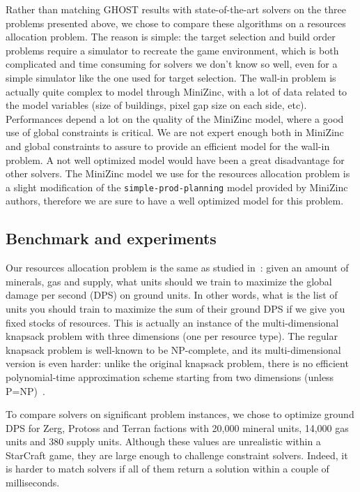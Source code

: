 \documentclass[journal]{IEEEtran}
\newcommand{\minormod}[1]{\color{red} #1\color{black} \xspace}
\newcommand{\ghost}{\textsc{GHOST}\xspace}
\begin{document}
Rather than  matching \ghost results with  state-of-the-art solvers on
the  three  problems  presented  above, we  chose  to  compare  these
algorithms on  a resources allocation  problem. The reason  is simple:
the target selection  and build order problems require  a simulator to
recreate  the game  environment, which  is both  complicated and  time
consuming  for solvers  we  don't  know so  well,  even  for a  simple
simulator like the one used  for target selection. The wall-in problem
is actually quite complex to model through MiniZinc, with a lot of data
related to the  model variables (size of buildings, pixel  gap size on
each side,  etc).  Performances  depend a  lot on  the quality  of the
MiniZinc model, where a good use of global constraints is critical. We
are  not expert  enough both  in  MiniZinc and  global constraints  to
assure to provide  an efficient model for the wall-in  problem.  A not
well optimized  model would have  been a great disadvantage  for other
solvers.   The MiniZinc  model  we use  for  the resources  allocation
problem  is a  slight  modification  of the {\tt simple-prod-planning} model  provided by  MiniZinc
authors, therefore we are sure to have a well optimized model for this problem.

\subsection{Benchmark and experiments}

Our resources allocation problem is the same as studied
in~\cite{aiide15_rts}: given an amount of minerals, gas and supply,
what units should we train to maximize the global damage per second
(DPS) on ground units. \minormod{In other words, what is the list of
  units you should train to maximize the sum of their ground DPS if we
  give you fixed stocks of resources.}  This is actually an instance
of the multi-dimensional knapsack problem with three dimensions (one
per resource type). The regular knapsack problem is well-known to be
NP-complete, and its multi-dimensional version is even harder: unlike
the original knapsack problem, there is no efficient polynomial-time
approximation scheme starting from two dimensions (unless
P=NP)~\cite{KulikS10}.

To  compare solvers  on  significant problem  instances,  we chose  to
optimize ground DPS for Zerg,  Protoss and Terran factions with 20,000
mineral units, 14,000  gas units and 380 supply  units. Although these
values are unrealistic within a  StarCraft game, they are large enough
to challenge constraint solvers. Indeed, it is harder to match solvers
if all of them return a solution within a couple of milliseconds.
\end{document}
